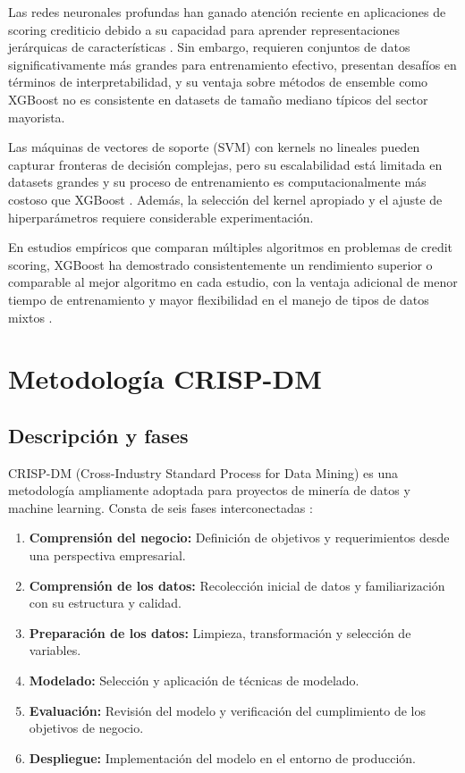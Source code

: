 Las redes neuronales profundas han ganado atención reciente en aplicaciones de scoring crediticio debido a su capacidad para aprender representaciones jerárquicas de características \cite{xia2017novel}. Sin embargo, requieren conjuntos de datos significativamente más grandes para entrenamiento efectivo, presentan desafíos en términos de interpretabilidad, y su ventaja sobre métodos de ensemble como XGBoost no es consistente en datasets de tamaño mediano típicos del sector mayorista.

Las máquinas de vectores de soporte (SVM) con kernels no lineales pueden capturar fronteras de decisión complejas, pero su escalabilidad está limitada en datasets grandes y su proceso de entrenamiento es computacionalmente más costoso que XGBoost \cite{huang2007credit}. Además, la selección del kernel apropiado y el ajuste de hiperparámetros requiere considerable experimentación.

En estudios empíricos que comparan múltiples algoritmos en problemas de credit scoring, XGBoost ha demostrado consistentemente un rendimiento superior o comparable al mejor algoritmo en cada estudio, con la ventaja adicional de menor tiempo de entrenamiento y mayor flexibilidad en el manejo de tipos de datos mixtos \cite{lessmann2015benchmarking,xia2017novel}.

\section{Metodología CRISP-DM}
\subsection{Descripción y fases}
CRISP-DM (Cross-Industry Standard Process for Data Mining) es una metodología ampliamente adoptada para proyectos de minería de datos y machine learning. Consta de seis fases interconectadas \cite{hernandez2020metodologia}:

\begin{enumerate}
    \item \textbf{Comprensión del negocio:} Definición de objetivos y requerimientos desde una perspectiva empresarial.
    \item \textbf{Comprensión de los datos:} Recolección inicial de datos y familiarización con su estructura y calidad.
    \item \textbf{Preparación de los datos:} Limpieza, transformación y selección de variables.
    \item \textbf{Modelado:} Selección y aplicación de técnicas de modelado.
    \item \textbf{Evaluación:} Revisión del modelo y verificación del cumplimiento de los objetivos de negocio.
    \item \textbf{Despliegue:} Implementación del modelo en el entorno de producción.
\end{enumerate}

